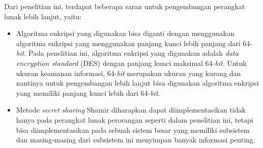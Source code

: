 Dari penelitian ini, terdapat beberapa saran untuk pengembangan perangkat lunak lebih lanjut, yaitu:
\begin{itemize}
	\item Algoritma enkripsi yang digunakan bisa diganti dengan menggunakan algoritma enkripsi yang menggunakan panjang kunci lebih panjang dari 64-\textit{bit}. Pada penelitian ini, algoritma enkripsi yang digunakan adalah \textit{data encryption standard} (DES) dengan panjang kunci maksimal 64-\textit{bit}. Untuk ukuran keamanan informasi, 64-\textit{bit} merupakan ukuran yang kurang dan nantinya untuk pengembangan lebih lanjut bisa digunakan algoritma enkripsi yang memiliki panjang kunci lebih dari 64-\textit{bit}.
	\item Metode \textit{secret sharing} Shamir diharapkan dapat diimplementasikan tidak hanya pada perangkat lunak perorangan seperti dalam penelitian ini, tetapi bisa diimplementasikan pada sebuah sistem besar yang memiliki subsistem dan masing-masing dari subsistem ini menyimpan banyak informasi penting.
\end{itemize}